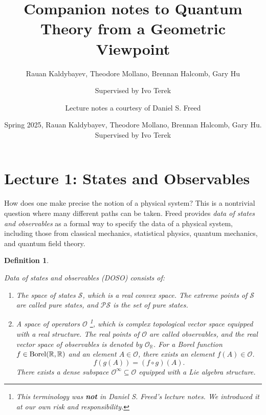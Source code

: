 \documentclass{amsart}
\title{Companion notes to Quantum Theory from a Geometric Viewpoint}
\author{Rauan Kaldybayev, Theodore Mollano, Brennan Halcomb, Gary Hu}
\author{Supervised by Ivo Terek}
\author{Lecture notes a courtesy of Daniel S. Freed}
\date{Spring 2025, Rauan Kaldybayev, Theodore Mollano, Brennan Halcomb, Gary Hu. Supervised by Ivo Terek}
\newcommand{\R}{\mathbb{R}}
\newcommand{\dq}[1]{\lq\lq{#1}\rq\rq}
\newcommand{\cS}{\mathcal{S}}
\newcommand{\cO}{\mathcal{O}}
\newtheorem{definition}[theorem]{Definition}
\begin{document}
\maketitle

\tableofcontents
\newpage



\section*{Lecture 1: States and Observables}

How does one make precise the notion of a physical system? This is a nontrivial question where many different paths can be taken. Freed provides \emph{data of states and observables} as a formal way to specify the data of a physical system, including those from classical mechanics, statistical physics, quantum mechanics, and quantum field theory.

\begin{definition} \label{defn:DOSO}

\emph{Data of states and observables} (DOSO) consists of:
\begin{enumerate}
    \item The \emph{space of states} $\cS$, which is a real convex space. The extreme points of $\cS$ are called \emph{pure states}, and $\mathcal{PS}$ is the set of pure states.

    \item A \emph{space of operators} $\cO$ \footnote{This terminology was \textbf{not} in Daniel S. Freed's lecture notes. We introduced it at our own risk and responsibility.}, which is complex topological vector space equipped with a real structure. The real points of $\cO$ are called \emph{observables}, and the real vector space of observables is denoted by $\cO_\R$. For a Borel function $f \in \textnormal{Borel}(\R, \R)$ and an element $A \in \cO$, there exists an element $f(A) \in \cO$.
    \begin{equation*}
        f(g(A)) = (f \circ g)(A).
    \end{equation*}
    There exists a dense subspace $\cO^\infty \subseteq \cO$ equipped with a Lie algebra structure.
\end{enumerate}
\end{definition}
\end{document}
